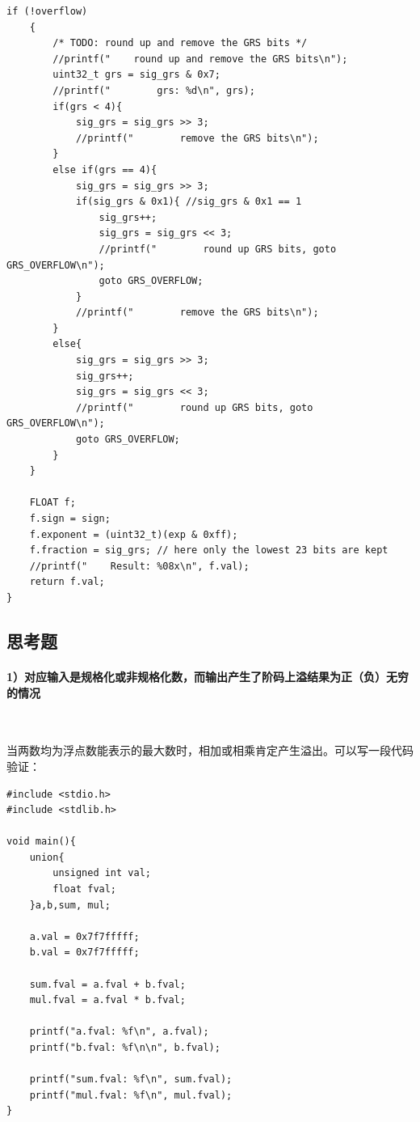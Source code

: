 \documentclass[UTF8]{ctexart}
\begin{document}
\begin{lstlisting}[style=CStyle]
    if (!overflow)
    {
        /* TODO: round up and remove the GRS bits */
        //printf("    round up and remove the GRS bits\n");
        uint32_t grs = sig_grs & 0x7;
        //printf("        grs: %d\n", grs);
        if(grs < 4){
            sig_grs = sig_grs >> 3;
            //printf("        remove the GRS bits\n");
        }
        else if(grs == 4){
            sig_grs = sig_grs >> 3;
            if(sig_grs & 0x1){ //sig_grs & 0x1 == 1
                sig_grs++;
                sig_grs = sig_grs << 3;
                //printf("        round up GRS bits, goto GRS_OVERFLOW\n");
                goto GRS_OVERFLOW;
            }
            //printf("        remove the GRS bits\n");
        }
        else{
            sig_grs = sig_grs >> 3;
            sig_grs++;
            sig_grs = sig_grs << 3;
            //printf("        round up GRS bits, goto GRS_OVERFLOW\n");
            goto GRS_OVERFLOW;
        }
    }

    FLOAT f;
    f.sign = sign;
    f.exponent = (uint32_t)(exp & 0xff);
    f.fraction = sig_grs; // here only the lowest 23 bits are kept
    //printf("    Result: %08x\n", f.val);
    return f.val;
}
\end{lstlisting}

\subsection{思考题}
\paragraph{1）对应输入是规格化或非规格化数，而输出产生了阶码上溢结果为正（负）无穷的情况}~
\par 当两数均为浮点数能表示的最大数时，相加或相乘肯定产生溢出。可以写一段代码验证：
\begin{lstlisting}[style=CStyle]
#include <stdio.h>
#include <stdlib.h>

void main(){
    union{
        unsigned int val;
        float fval;
    }a,b,sum, mul;

    a.val = 0x7f7fffff;
    b.val = 0x7f7fffff;

    sum.fval = a.fval + b.fval;
    mul.fval = a.fval * b.fval;

    printf("a.fval: %f\n", a.fval);
    printf("b.fval: %f\n\n", b.fval);

    printf("sum.fval: %f\n", sum.fval);
    printf("mul.fval: %f\n", mul.fval);
}
\end{lstlisting}
\end{document}

